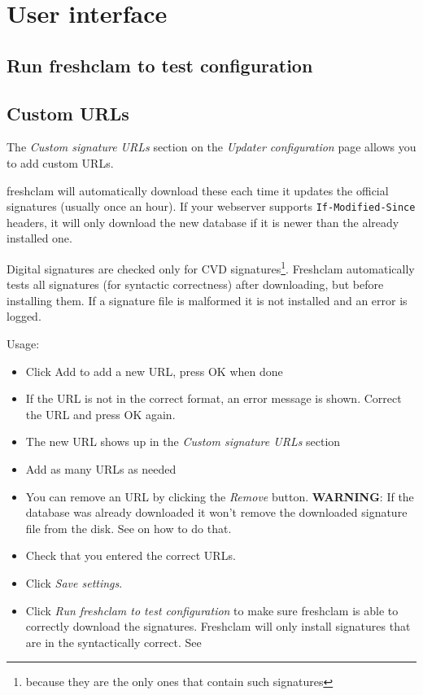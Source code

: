 \chapter{User interface}
\section{Run freshclam to test configuration}
\label{sec:runfreshclam}
\section{Custom URLs}
\label{sec:ui_urladd}
The \emph{Custom signature URLs} section on the \emph{Updater configuration}
page allows you to add custom URLs.

\Gls{freshclam} will automatically download these each time it updates the official signatures (usually once an hour).
If your webserver supports \verb+If-Modified-Since+ headers, it will only
download the new database if it is newer than the already installed one.

Digital signatures  are checked only for \gls{CVD} signatures\footnote{because they are the only ones that contain such signatures}.
Freshclam automatically tests all signatures (for syntactic correctness) after downloading, but
before installing them. If a signature file is malformed it is not installed and
an error is logged.

Usage:
\begin{itemize}
\item Click Add to add a new URL, press OK when done
\item If the URL is not in the correct format, an error message is shown.
Correct the URL and press OK again.
\item The new URL shows up in the \emph{Custom signature URLs} section
\item Add as many URLs as needed
\item You can remove an URL by clicking the \emph{Remove} button.
\textbf{WARNING}: If the database was already downloaded it won't remove the downloaded signature file from the disk.
See  on how to do that.
\item Check that you entered the correct URLs.
\item Click \emph{Save settings}.
\item Click \emph{Run freshclam to test configuration} to make sure freshclam is
able to correctly download the signatures. Freshclam will only install
signatures that are in the syntactically correct.
See 
\end{itemize}

